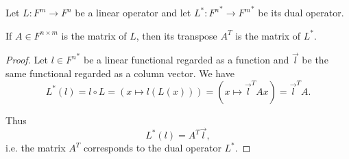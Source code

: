 \begin{proposition}\label{thm:dual_linear_operator_matrix_transpose}
  Let \( L: F^m \to F^n \) be a linear operator and let \( L^*: {F^n}^* \to {F^m}^* \) be its dual operator.

  If \( A \in F^{n \times m} \) is the matrix of \( L \), then its transpose \( A^T \) is the matrix of \( L^* \).
\end{proposition}
\begin{proof}
  Let \( l \in {F^n}^* \) be a linear functional regarded as a function and \( \vec l \) be the same functional regarded as a column vector. We have
  \begin{equation*}
    L^*(l)
    =
    l \circ L
    =
    (x \mapsto l(L(x)))
    =
    (x \mapsto \vec l^T Ax)
    =
    \vec l^T A.
  \end{equation*}

  Thus
  \begin{equation*}
    L^*(l) = A^T \vec l,
  \end{equation*}
  i.e. the matrix \( A^T \) corresponds to the dual operator \( L^* \).
\end{proof}

